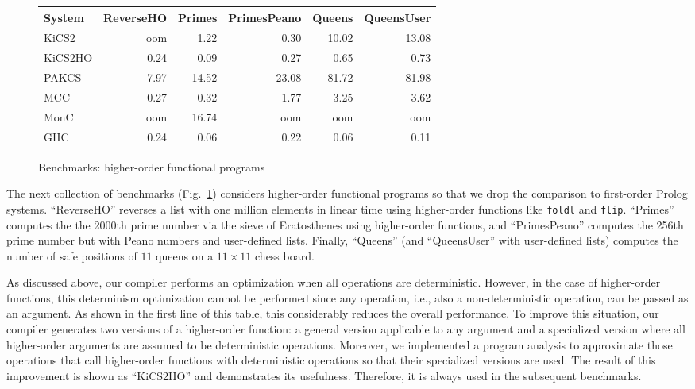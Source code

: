 \documentclass{llncs}
\newcommand{\code}[1]{\mbox{\small\texttt{#1}}}
\begin{document}
\begin{figure}
\centering
\begin{tabular}{|@{~~}l@{~~}|*{5}{@{~~}r@{~~}|}}
\hline
System  & ReverseHO & Primes & PrimesPeano & Queens & QueensUser \\\hline
KiCS2   &      oom  &   1.22 &       0.30  &  10.02 &     13.08  \\
KiCS2HO &     0.24  &   0.09 &       0.27  &   0.65 &      0.73  \\
PAKCS   &     7.97  &  14.52 &      23.08  &  81.72 &     81.98  \\
MCC     &     0.27  &   0.32 &       1.77  &   3.25 &      3.62  \\
MonC    &      oom  &  16.74 &        oom  &    oom &       oom  \\
GHC     &     0.24  &   0.06 &       0.22  &   0.06 &      0.11  \\
\hline
\end{tabular}
\caption{Benchmarks: higher-order functional programs}
 \label{fig:bench-higher-order}
\end{figure}
%
The next collection of benchmarks (Fig.~\ref{fig:bench-higher-order})
considers higher-order functional programs so that we drop
the comparison to first-order Prolog systems.
``ReverseHO'' reverses a list with one million
elements in linear time using higher-order functions
like \code{foldl} and \code{flip}.
``Primes'' computes the the 2000th prime number via the
sieve of Eratosthenes using higher-order functions,
and ``PrimesPeano'' computes the 256th prime number but
with Peano numbers and user-defined lists.
Finally, ``Queens'' (and ``QueensUser'' with user-defined lists)
computes the number of safe positions of $11$ queens on a $11 \times 11$
chess board.

As discussed above, our compiler performs an optimization
when all operations are deterministic. However, in the case
of higher-order functions, this determinism optimization cannot be performed
since any operation, i.e., also a non-deterministic operation,
can be passed as an argument. As shown in the first line of this table,
this considerably reduces the overall performance.
To improve this situation, our compiler generates two versions
of a higher-order function: a general version applicable to any
argument and a specialized version where all higher-order arguments
are assumed to be deterministic operations.
Moreover, we implemented a program analysis
to approximate those operations that call higher-order functions
with deterministic operations so that their specialized versions
are used. The result of this improvement
is shown as ``KiCS2HO'' and demonstrates its usefulness.
Therefore, it is always used in the subsequent benchmarks.
\end{document}
